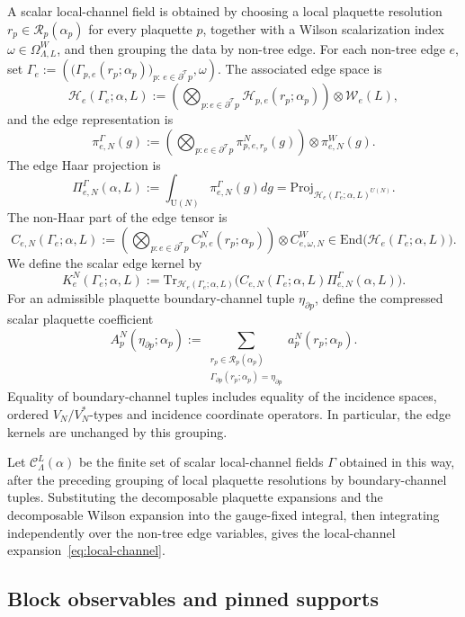 \documentclass[11pt,a4paper,reqno]{amsart}
\theoremstyle{definition}
\theoremstyle{remark}
\newcommand\U{{\mathrm U}}
\newcommand\Tr{{\mathrm{Tr}}}
\newcommand\Proj{{\mathrm{Proj}}}
\newcommand\End{{\mathrm{End}}}
\begin{document}
A scalar local-channel field is obtained by choosing a local plaquette resolution $r_p\in\mathcal R_p(\alpha_p)$ for every plaquette $p$, together with a Wilson scalarization index $\omega\in\Omega^W_{\Lambda,L}$, and then grouping the data by non-tree edge. For each non-tree edge $e$, set $\Gamma_e:=\left(\bigl(\Gamma_{p,e}(r_p;\alpha_p)\bigr)_{p:\,e\in\partial^{\mathcal T} p},\omega\right).$ The associated edge space is
\[
\mathcal H_e(\Gamma_e;\alpha,L):=\left(\bigotimes_{p: e\in\partial^{\mathcal T} p}\mathcal H_{p,e}(r_p;\alpha_p)\right)\otimes \mathcal W_e(L),
\]
and the edge representation is
\[
\pi^\Gamma_{e,N}(g):=\left(\bigotimes_{p: e\in\partial^{\mathcal T} p}\pi^N_{p,e,r_p}(g)\right)\otimes \pi^W_{e,N}(g).
\]
The edge Haar projection is
\[
\Pi^\Gamma_{e,N}(\alpha,L):=\int_{\U(N)}\pi^\Gamma_{e,N}(g) dg=\Proj_{\mathcal H_e(\Gamma_e;\alpha,L)^{U(N)}} .
\]
The non-Haar part of the edge tensor is
\[
C_{e,N}(\Gamma_e;\alpha,L):=\left(\bigotimes_{p: e\in\partial^{\mathcal T} p}C^N_{p,e}(r_p;\alpha_p)\right)\otimes C^W_{e,\omega,N}\in\End\bigl(\mathcal H_e(\Gamma_e;\alpha,L)\bigr).
\]
We define the scalar edge kernel by
\[
K^N_e(\Gamma_e;\alpha,L):=\Tr_{\mathcal H_e(\Gamma_e;\alpha,L)}\bigl(C_{e,N}(\Gamma_e;\alpha,L) \Pi^\Gamma_{e,N}(\alpha,L)\bigr).
\]
For an admissible plaquette boundary-channel tuple $\eta_{\partial p}$, define the compressed scalar plaquette coefficient
\[
A_p^N(\eta_{\partial p};\alpha_p):=\sum_{\substack{r_p\in\mathcal R_p(\alpha_p)\\ \Gamma_{\partial p}(r_p;\alpha_p)=\eta_{\partial p}}}a_p^N(r_p;\alpha_p).
\]
Equality of boundary-channel tuples includes equality of the incidence spaces, ordered $V_N/V_N^*$-types and incidence coordinate operators. In particular, the
edge kernels are unchanged by this grouping.

Let $\mathcal C^L_\Lambda(\alpha)$ be the finite set of scalar local-channel fields $\Gamma$ obtained in this way, after the preceding grouping of local plaquette resolutions by boundary-channel tuples. Substituting the decomposable plaquette expansions and the decomposable Wilson expansion into the gauge-fixed integral, then integrating independently over the non-tree edge variables, gives the local-channel expansion~\eqref{eq:local-channel}.


\subsection{Block observables and pinned supports}\label{subsec:pinned-block-observables}\label{subsec:local-channel-expansion}
\end{document}

